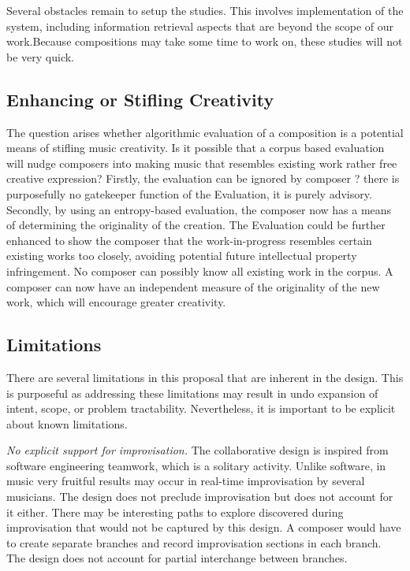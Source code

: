 \documentclass[final,authoryear,5p,times,twocolumn]{elsarticle}
\begin{document}
Several obstacles remain to setup the studies. This involves implementation of the system, including information retrieval aspects that are beyond the scope of our work.Because compositions may take some time to work on, these studies will not be very quick.

\subsection{Enhancing or Stifling Creativity}

The question arises whether algorithmic evaluation of a composition is a potential means of stifling music creativity. Is it possible that a corpus based evaluation will nudge composers into making music that resembles existing work rather free creative expression? Firstly, the evaluation can be ignored by composer ? there is purposefully no gatekeeper function of the Evaluation, it is purely advisory. Secondly, by using an entropy-based evaluation, the composer now has a means of determining the originality of the creation. The Evaluation could be further enhanced to show the composer that the work-in-progress resembles certain existing works too closely, avoiding potential future intellectual property infringement. No composer can possibly know all existing work in the corpus. A composer can now have an independent measure of the originality of the new work, which will encourage greater creativity.

\subsection{Limitations}

There are several limitations in this proposal that are inherent in the design. This is purposeful as addressing these limitations may result in undo expansion of intent, scope, or problem tractability. Nevertheless, it is important to be explicit about known limitations.

\textit{No explicit support for improvisation.} The collaborative design is inspired from software engineering teamwork, which is a solitary activity. Unlike software, in music very fruitful results may occur in real-time improvisation by several musicians. The design does not preclude improvisation but does not account for it either. There may be interesting paths to explore discovered during improvisation that would not be captured by this design. A composer would have to create separate branches and record improvisation sections in each branch. The design does not account for partial interchange between branches.
\end{document}
